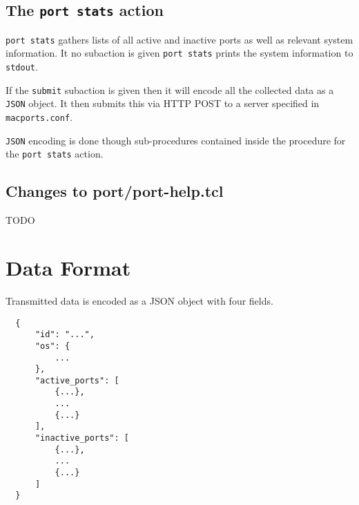 \documentclass[10pt]{article}
\begin{document}
\subsection{The \texttt{port stats} action}
\texttt{port stats} gathers lists of all active and inactive ports as well as relevant system information. It no subaction is given \texttt{port stats} prints the system information to \texttt{stdout}.

If the \texttt{submit} subaction is given then it will encode all the collected data as a \texttt{JSON} object. It then submits this via HTTP POST to a server specified in \texttt{macports.conf}.

\texttt{JSON} encoding is done though sub-procedures contained inside the procedure for the \texttt{port stats} action.

\subsection{Changes to port/port-help.tcl}
TODO

\section{Data Format}

Transmitted data is encoded as a JSON object with four fields.

\begin{verbatim}
  {
      "id": "...",
      "os": {
          ...
      },
      "active_ports": [
          {...}, 
          ...
          {...}
      ],
      "inactive_ports": [
          {...}, 
          ...
          {...}
      ]
  }
\end{verbatim}
\end{document}
